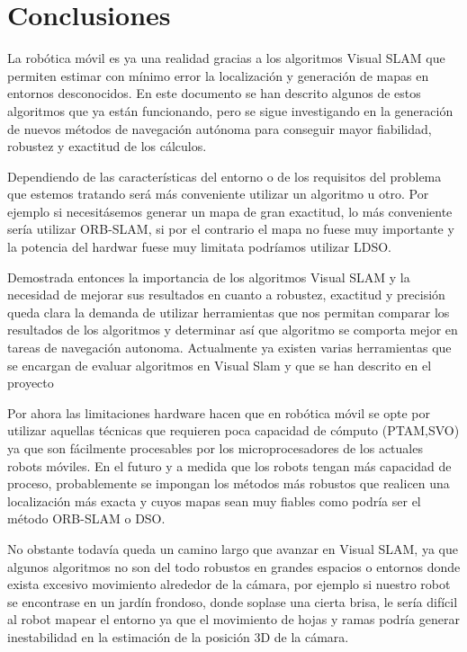 \newpage
\chapter{Conclusiones} \label{cap:conclusiones}
La robótica móvil es ya una realidad gracias a los algoritmos Visual SLAM que permiten estimar con mínimo error la localización y generación de mapas en entornos desconocidos.
En este documento se han descrito algunos de estos algoritmos que ya están funcionando, pero se sigue investigando en la generación de nuevos métodos de navegación autónoma para conseguir mayor fiabilidad, robustez y exactitud de los cálculos.

Dependiendo de las características del entorno o de los requisitos del problema que estemos tratando será más conveniente utilizar un algoritmo u otro.
Por ejemplo si necesitásemos generar un mapa de gran exactitud, lo más conveniente sería
utilizar ORB-SLAM, si por el contrario el mapa no fuese muy importante y la potencia del hardwar fuese muy limitata podríamos utilizar LDSO.

Demostrada entonces la importancia de los algoritmos Visual SLAM y la necesidad de mejorar sus resultados en cuanto a robustez, exactitud y precisión queda clara la demanda de utilizar herramientas que nos permitan comparar los resultados de los algoritmos y determinar así que algoritmo se comporta mejor en tareas de navegación autonoma. Actualmente ya existen varias herramientas que se encargan de evaluar algoritmos en Visual Slam y que se han descrito en el proyecto 

Por ahora las limitaciones hardware hacen que en robótica móvil se opte por utilizar aquellas técnicas que requieren poca capacidad de cómputo (PTAM,SVO) ya que son fácilmente procesables por los microprocesadores de los actuales robots móviles. En el futuro y a medida que los robots tengan más capacidad de proceso, probablemente se impongan los métodos más robustos que realicen una localización más exacta y cuyos mapas sean muy fiables como podría ser el método ORB-SLAM o DSO.

No obstante todavía queda un camino largo que avanzar en Visual SLAM, ya que algunos algoritmos no son del todo robustos en grandes espacios o entornos donde exista excesivo movimiento alrededor de la cámara, por ejemplo si nuestro robot se encontrase en un jardín frondoso, donde soplase una cierta brisa, le sería difícil al robot mapear el entorno ya que el movimiento de hojas y ramas podría generar inestabilidad en la estimación de la posición 3D de la cámara.

